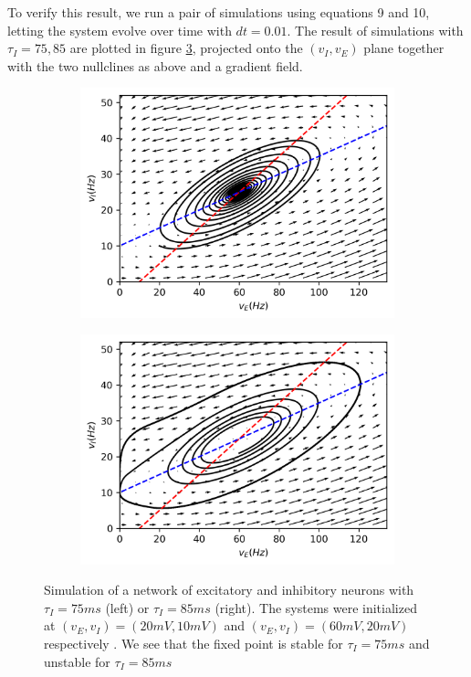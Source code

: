 \documentclass{article}
\begin{document}
To verify this result, we run a pair of simulations using equations 9 and 10, letting the system evolve over time with $dt=0.01$. The result of simulations with $\tau_I = 75, 85$ are plotted in figure \ref{fig:sims}, projected onto the $(v_I, v_E)$ plane together with the two nullclines as above and a gradient field.



\begin{figure}[h]
	\centering
	\begin{subfigure}[t]{0.45\linewidth}
		\centering
		\includegraphics[width = 1.0\linewidth, trim={0 7 0 0}, clip=true]{trajectcon.png}
		\subcaption{}
		\label{fig:con}	
	\end{subfigure}%
	\hspace{0.001\linewidth}
	\begin{subfigure}[t]{0.45\linewidth}
		\centering
		\includegraphics[width = 1.0\linewidth, trim={0 7 0 0}, clip=true]{trajectdiv.png}
		\subcaption{}
		\label{fig:div}	
	\end{subfigure}%
\label{fig:sims}
\caption{Simulation of a network of excitatory and inhibitory neurons with $\tau_I = 75 ms$ (left) or $\tau_I = 85 ms$ (right). The systems were initialized at $(v_E, v_I) = (20 mV, 10 mV)$ and $(v_E, v_I) = (60 mV, 20 mV)$ respectively . We see that the fixed point is stable for $\tau_I = 75 ms$ and unstable for $\tau_I = 85 ms$ }
\end{figure}
\end{document}
